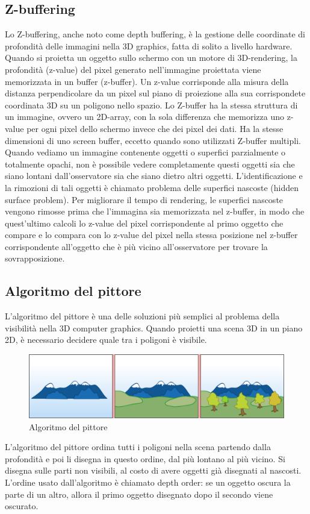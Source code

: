 \documentclass[9pt,a4paper,twoside]{tau}
\begin{document}
\subsection{Z-buffering}
Lo Z-buffering, anche noto come depth buffering, è la gestione delle coordinate di profondità delle immagini nella 3D graphics, fatta di solito a livello hardware. Quando si proietta un oggetto sullo schermo con un motore di 3D-rendering, la profondità (z-value) del pixel generato nell'immagine proiettata viene memorizzata in un buffer (z-buffer). Un z-value corrisponde alla misura della distanza perpendicolare da un pixel sul piano di proiezione alla sua corrispondete coordinata 3D su un poligono nello spazio. Lo Z-buffer ha la stessa struttura di un immagine, ovvero un 2D-array, con la sola differenza che memorizza uno z-value per ogni pixel dello schermo invece che dei pixel dei dati. Ha la stesse dimensioni di uno screen buffer, eccetto quando sono utilizzati Z-buffer multipli. \\
Quando vediamo un immagine contenente oggetti o superfici parzialmente o totalmente opachi, non è possibile vedere completamente questi oggetti sia che siano lontani dall'osservatore sia che siano dietro altri oggetti. L'identificazione e la rimozioni di tali oggetti è chiamato problema delle superfici nascoste (hidden surface problem). Per migliorare il tempo di rendering, le superfici nascoste vengono rimosse prima che l'immagina sia memorizzata nel z-buffer, in modo che quest'ultimo calcoli lo z-value del pixel corrispondente al primo oggetto che compare e lo compara con lo z-value del pixel nella stessa posizione nel z-buffer corrispondente all'oggetto che è più vicino all'osservatore per trovare la sovrapposizione.
\subsection{Algoritmo del pittore}
L'algoritmo del pittore è una delle soluzioni più semplici al problema della visibilità nella 3D computer graphics. Quando proietti una scena 3D in un piano 2D, è necessario decidere quale  tra i poligoni è visibile. 
\begin{figure}[H]
    \centering
    \includegraphics[width=0.7\columnwidth]{Figures/10.png}
    \caption{Algoritmo del pittore}
    \label{fig:figure}
\end{figure}
L'algoritmo del pittore ordina tutti i poligoni nella scena partendo dalla profondità e poi li disegna in questo ordine, dal più lontano al più vicino. Si disegna sulle parti non visibili, al costo di avere oggetti già disegnati al nascosti. L'ordine usato dall'algoritmo è chiamato depth order: se un oggetto oscura la parte di un altro, allora il primo oggetto disegnato dopo il secondo viene oscurato. 
\end{document}
